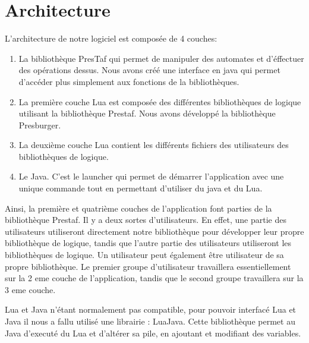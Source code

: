 \section{Architecture}

L'architecture de notre logiciel est composée de 4 couches:
\begin{enumerate}
	\item La bibliothèque PresTaf qui permet de manipuler des automates et d'éffectuer des opérations dessus. Nous avons créé une interface en java qui permet d'accéder plus simplement aux fonctions de la bibliothèques.
	\item La première couche Lua est composée des différentes bibliothèques de logique utilisant la bibliothèque Prestaf. Nous avons développé la bibliothèque Presburger.
	\item La deuxième couche Lua contient les différents fichiers des utilisateurs des bibliothèques de logique.
	\item Le Java. C'est le launcher qui permet de démarrer l'application avec une unique commande tout en permettant d'utiliser du java et du Lua.
\end{enumerate}

Ainsi, la première et quatrième couches de l'application font parties de la bibliothèque Prestaf. Il y a deux sortes d'utilisateurs. En effet, une partie des utilisateurs utiliseront directement notre bibliothèque pour développer leur propre bibliothèque de logique, tandis que l'autre partie des utilisateurs utiliseront les bibliothèques de logique. Un utilisateur peut également être utilisateur de sa propre bibliothèque. Le premier groupe d'utilisateur travaillera essentiellement sur la 2 eme couche de l'application, tandis que le second groupe travaillera sur la 3 eme couche.\\\par

Lua et Java n'étant normalement pas compatible, pour pouvoir interfacé Lua et Java il nous a fallu utilisé une librairie : LuaJava. Cette bibliothèque permet au Java d'executé du Lua et d'altérer sa pile, en ajoutant et modifiant des variables.\\

